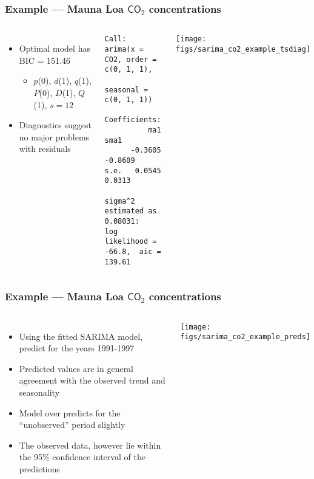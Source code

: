 \documentclass{beamer}
\begin{document}
\begin{frame}[fragile]
    \frametitle{Example --- Mauna Loa $\mathsf{CO_2}$ concentrations}
    \small
    \begin{columns}
    \column{7cm}
        \begin{itemize}
            \item Optimal model has BIC = 151.46
            \begin{itemize}
                \item $p$(0), $d$(1), $q$(1), $P$(0), $D$(1), $Q$(1), $s={12}$
            \end{itemize}
            \item Diagnostics suggest no major problems with residuals
        \end{itemize}
        \scriptsize
        \begin{verbatim}
Call:
arima(x = CO2, order = c(0, 1, 1), 
      seasonal = c(0, 1, 1))

Coefficients:
          ma1     sma1
      -0.3605  -0.8609
s.e.   0.0545   0.0313

sigma^2 estimated as 0.08031:  
log likelihood = -66.8,  aic = 139.61
        \end{verbatim}
        \small
    \column{5cm}
    \texttt{[image: figs/sarima\_co2\_example\_tsdiag]}
    \end{columns}
    \normalsize
\end{frame}

\begin{frame}
    \frametitle{Example --- Mauna Loa $\mathsf{CO_2}$ concentrations}
    \begin{columns}
    \column{7cm}
        \begin{itemize}
            \item Using the fitted SARIMA model, predict for the years 1991-1997
            \item Predicted values are in general agreement with the observed trend and seasonality
            \item Model over predicts for the ``unobserved'' period slightly
            \item The observed data, however lie within the 95\% confidence interval of the predictions
        \end{itemize}
    \column{5cm}
    \texttt{[image: figs/sarima\_co2\_example\_preds]}
    \end{columns}
    \normalsize
\end{frame}
\end{document}
